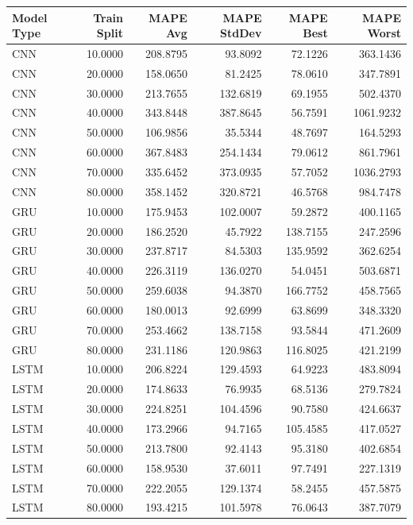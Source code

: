 \begin{tabular}{lrrrrr}
\toprule
Model Type & Train Split & MAPE Avg & MAPE StdDev & MAPE Best & MAPE Worst \\
\midrule
CNN & 10.0000 & 208.8795 & 93.8092 & 72.1226 & 363.1436 \\
CNN & 20.0000 & 158.0650 & 81.2425 & 78.0610 & 347.7891 \\
CNN & 30.0000 & 213.7655 & 132.6819 & 69.1955 & 502.4370 \\
CNN & 40.0000 & 343.8448 & 387.8645 & 56.7591 & 1061.9232 \\
CNN & 50.0000 & 106.9856 & 35.5344 & 48.7697 & 164.5293 \\
CNN & 60.0000 & 367.8483 & 254.1434 & 79.0612 & 861.7961 \\
CNN & 70.0000 & 335.6452 & 373.0935 & 57.7052 & 1036.2793 \\
CNN & 80.0000 & 358.1452 & 320.8721 & 46.5768 & 984.7478 \\
GRU & 10.0000 & 175.9453 & 102.0007 & 59.2872 & 400.1165 \\
GRU & 20.0000 & 186.2520 & 45.7922 & 138.7155 & 247.2596 \\
GRU & 30.0000 & 237.8717 & 84.5303 & 135.9592 & 362.6254 \\
GRU & 40.0000 & 226.3119 & 136.0270 & 54.0451 & 503.6871 \\
GRU & 50.0000 & 259.6038 & 94.3870 & 166.7752 & 458.7565 \\
GRU & 60.0000 & 180.0013 & 92.6999 & 63.8699 & 348.3320 \\
GRU & 70.0000 & 253.4662 & 138.7158 & 93.5844 & 471.2609 \\
GRU & 80.0000 & 231.1186 & 120.9863 & 116.8025 & 421.2199 \\
LSTM & 10.0000 & 206.8224 & 129.4593 & 64.9223 & 483.8094 \\
LSTM & 20.0000 & 174.8633 & 76.9935 & 68.5136 & 279.7824 \\
LSTM & 30.0000 & 224.8251 & 104.4596 & 90.7580 & 424.6637 \\
LSTM & 40.0000 & 173.2966 & 94.7165 & 105.4585 & 417.0527 \\
LSTM & 50.0000 & 213.7800 & 92.4143 & 95.3180 & 402.6854 \\
LSTM & 60.0000 & 158.9530 & 37.6011 & 97.7491 & 227.1319 \\
LSTM & 70.0000 & 222.2055 & 129.1374 & 58.2455 & 457.5875 \\
LSTM & 80.0000 & 193.4215 & 101.5978 & 76.0643 & 387.7079 \\

\end{tabular}
